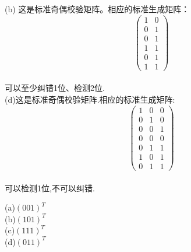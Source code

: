 \documentclass[a4paper, justified]{tufte-handout}
\begin{document}
\begin{problem}[TJ 8-11(b,d)]
\end{problem}

\begin{solution}
  (b)
  这是标准奇偶校验矩阵。相应的标准生成矩阵：
  $$
    \left(\begin{array}{ll}
      1 & 0 \\
      0 & 1 \\
      0 & 1 \\
      1 & 1 \\
      0 & 1 \\
      1 & 1
    \end{array}\right)
  $$\\
  可以至少纠错1位、检测2位.\\
  (d)这是标准奇偶校验矩阵.相应的标准生成矩阵:
  $$
    \left(\begin{array}{lll}
      1 & 0 & 0 \\
      0 & 1 & 0 \\
      0 & 0 & 1 \\
      0 & 0 & 0 \\
      0 & 1 & 1 \\
      1 & 0 & 1 \\
      0 & 1 & 1
    \end{array}\right)
  $$\\
  可以检测1位,不可以纠错.
\end{solution}

\begin{problem}[TJ 8-13]
\end{problem}

\begin{solution}
  (a)$(001)^T$\\
  (b)$(101)^T$\\
  (c)$(111)^T$\\
  (d)$(011)^T$\\
\end{solution}

\begin{problem}[TJ 8-19]
\end{problem}
\end{document}

